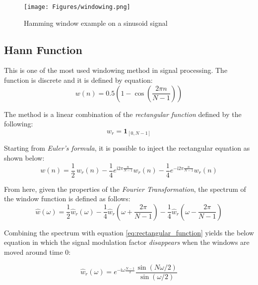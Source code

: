 \begin{figure}[!ht]
	\centering
	\texttt{[image: Figures/windowing.png]}
	\caption{Hamming window example on a sinusoid signal}
	\label{fig:windowing_ex}
\end{figure}


\subsection{Hann Function}
\label{ssubs:hann_function}
This is one of the most used windowing method in signal processing. The function is discrete and it is defined by equation: 
\begin{equation}
w(n) = 0.5 \left(1 - \cos \left ( \frac{2 \pi n}{N-1} \right) \right) \label{eq:discrete_window_function}
\end{equation}

The method is a linear combination of the \textit{rectangular function} defined by the following:
\begin{equation}
w_r = \mathbf{1}_{[0,N-1]} \label{eq:rectangular_function}
\end{equation}

Starting from \textit{Euler's formula}, it is possible to inject the rectangular equation as shown below: 
\begin{equation}
w(n) = \frac{1}{2} \,w_r(n) -\frac{1}{4} e^{\mathrm{i}2\pi \frac{n}{N-1}} w_r(n) - \frac{1}{4}e^{-\mathrm{i}2\pi \frac{n}{N-1}} w_r(n) \label{eq:euler_formula}
\end{equation}

From here, given the properties of the \textit{Fourier Transformation}, the spectrum of the window function is defined as follows:
\begin{equation}
\hat{w} (\omega) = \frac{1}{2} \hat{w}_r (\omega) - \frac{1}{4} \hat{w}_r \left(\omega + \frac{2\pi}{N-1}\right) - \frac{1}{4} \hat{w}_r \left(\omega - \frac{2\pi}{N-1}\right) \label{eq:spectrum_ft}
\end{equation} 

Combining the spectrum with equation \ref{eq:rectangular_function} yields the below equation in which the signal modulation factor \textit{disappears} when the windows are moved around time $0$:

\begin{equation}
\hat{w}_r (\omega) = e^{-\mathrm{i} \omega \frac{N-1}{2}} \frac{\sin(N\omega/2)}{\sin(\omega/2)} \label{eq:final_hann}
\end{equation}

